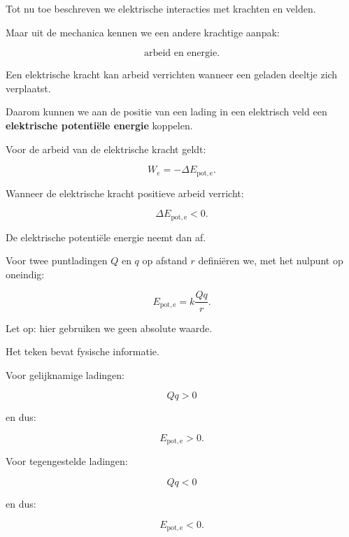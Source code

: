 \documentclass{ximera}
\begin{document}


Tot nu toe beschreven we elektrische interacties met krachten en
velden.

Maar uit de mechanica kennen we een andere krachtige aanpak:

\[
\text{arbeid en energie}.
\]

Een elektrische kracht kan arbeid verrichten wanneer een geladen
deeltje zich verplaatst.

Daarom kunnen we aan de positie van een lading in een elektrisch veld
een \textbf{elektrische potentiële energie} koppelen.

Voor de arbeid van de elektrische kracht geldt:

\[
\boxed{
W_e=-\Delta E_{\mathrm{pot,e}}.
}
\]

Wanneer de elektrische kracht positieve arbeid verricht:

\[
\Delta E_{\mathrm{pot,e}}<0.
\]

De elektrische potentiële energie neemt dan af.




Voor twee puntladingen $Q$ en $q$ op afstand $r$ definiëren we, met
het nulpunt op oneindig:

\[
\boxed{
E_{\mathrm{pot,e}}
=
k\frac{Qq}{r}.
}
\]

Let op: hier gebruiken we geen absolute waarde.

Het teken bevat fysische informatie.


Voor gelijknamige ladingen:

\[
Qq>0
\]

en dus:

\[
E_{\mathrm{pot,e}}>0.
\]


Voor tegengestelde ladingen:

\[
Qq<0
\]

en dus:

\[
E_{\mathrm{pot,e}}<0.
\]


\end{document}
